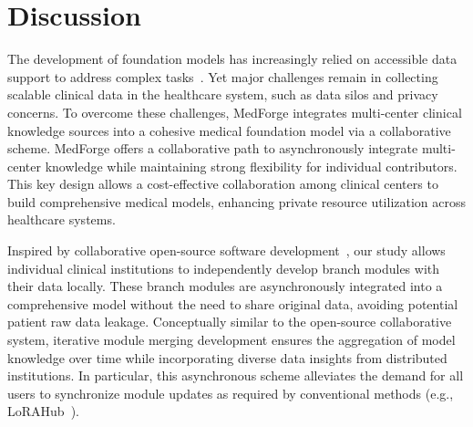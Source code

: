 \section{Discussion}
The development of foundation models has increasingly relied on accessible data support to address complex tasks~\cite{zhang2024data}. Yet major challenges remain in collecting scalable clinical data in the healthcare system, such as data silos and privacy concerns. To overcome these challenges, MedForge integrates multi-center clinical knowledge sources into a cohesive medical foundation model via a collaborative scheme. MedForge offers a collaborative path to asynchronously integrate multi-center knowledge while maintaining strong flexibility for individual contributors.
This key design allows a cost-effective collaboration among clinical centers to build comprehensive medical models, enhancing private resource utilization across healthcare systems.

Inspired by collaborative open-source software development~\cite{raffel2023building, github}, our study allows individual clinical institutions to independently develop branch modules with their data locally. These branch modules are asynchronously integrated into a comprehensive model without the need to share original data, avoiding potential patient raw data leakage. Conceptually similar to the open-source collaborative system, iterative module merging development ensures the aggregation of model knowledge over time while incorporating diverse data insights from distributed institutions. In particular, this asynchronous scheme alleviates the demand for all users to synchronize module updates as required by conventional methods (e.g., LoRAHub~\cite{huang2023lorahub}).


